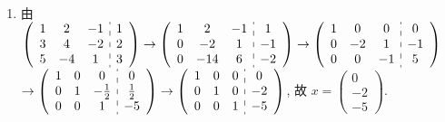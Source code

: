 	 \paragraph{} %
		 \begin{enumerate}
			 \item %
			       由 $\left(\begin{array}{ccc:c}
					       1 & 2  & -1 & 1 \\
					       3 & 4  & -2 & 2 \\
					       5 & -4 & 1  & 3
				       \end{array}\right) \to \left(\begin{array}{ccc:c}
					       1 & 2   & -1 & 1  \\
					       0 & -2  & 1  & -1 \\
					       0 & -14 & 6  & -2
				       \end{array}\right) \to \left(\begin{array}{ccc:c}
					       1 & 0  & 0  & 0  \\
					       0 & -2 & 1  & -1 \\
					       0 & 0  & -1 & 5
				       \end{array}\right)$
			       $\to \left(\begin{array}{ccc:c}
					       1 & 0 & 0            & 0           \\
					       0 & 1 & -\frac{1}{2} & \frac{1}{2} \\
					       0 & 0 & 1            & -5
				       \end{array}\right) \to \left(\begin{array}{ccc:c}
					       1 & 0 & 0 & 0  \\
					       0 & 1 & 0 & -2 \\
					       0 & 0 & 1 & -5
				       \end{array}\right)$,
			       故 $x = \begin{pmatrix}
					       0  \\
					       -2 \\
					       -5
				       \end{pmatrix}$.


\end{enumerate}
